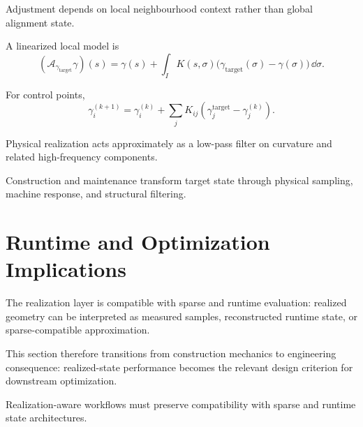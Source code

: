 \begin{proposition}[Locality]
\label{prop:adjustment-locality}
Adjustment depends on local neighbourhood context rather than global
alignment state.
\end{proposition}

\begin{definition}
\label{def:kernel-based-adjustment}
A linearized local model is
\[
(\mathcal A_{\gamma_{\mathrm{target}}}\gamma)(s)
=
\gamma(s)+
\int_I K(s,\sigma)
\bigl(\gamma_{\mathrm{target}}(\sigma)-\gamma(\sigma)\bigr)
\,\dd\sigma.
\]
\end{definition}

\begin{definition}
\label{def:discrete-adjustment-model}
For control points,
\[
\gamma_i^{(k+1)}
=
\gamma_i^{(k)}+
\sum_j K_{ij}\left(\gamma_j^{\mathrm{target}}-\gamma_j^{(k)}\right).
\]
\end{definition}

\begin{proposition}
\label{prop:realization-low-pass}
Physical realization acts approximately as a low-pass filter on
curvature and related high-frequency components.
\end{proposition}

\begin{principle}
\label{princ:realization-filter}
Construction and maintenance transform target state through physical
sampling, machine response, and structural filtering.
\end{principle}

\section{Runtime and Optimization Implications}

The realization layer is compatible with sparse and runtime evaluation:
realized geometry can be interpreted as measured samples, reconstructed
runtime state, or sparse-compatible approximation.

This section therefore transitions from construction mechanics to
engineering consequence: realized-state performance becomes the relevant
design criterion for downstream optimization.

\begin{principle}
\label{princ:sparse-realization-compatibility}
Realization-aware workflows must preserve compatibility with sparse and
runtime state architectures.
\end{principle}

